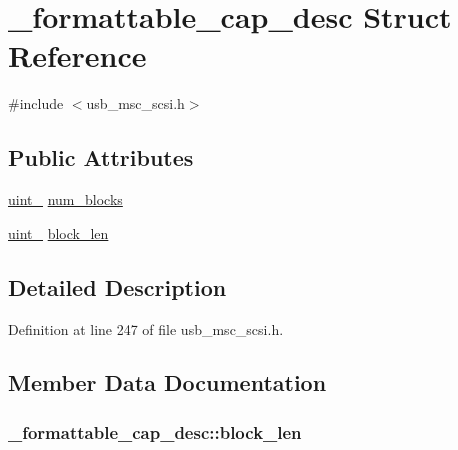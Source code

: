\hypertarget{struct__formattable__cap__desc}{}\section{\+\_\+formattable\+\_\+cap\+\_\+desc Struct Reference}
\label{struct__formattable__cap__desc}


{\ttfamily \#include $<$usb\+\_\+msc\+\_\+scsi.\+h$>$}

\subsection*{Public Attributes}
\begin{DoxyCompactItemize}
\item 
\hyperlink{types_8h_a5532400b872b4aa84e54335bf458a318}{uint\+\_} \hyperlink{struct__formattable__cap__desc_acd5b9eff05c2086f26b00499a758b0d3}{num\+\_\+blocks}
\item 
\hyperlink{types_8h_a5532400b872b4aa84e54335bf458a318}{uint\+\_} \hyperlink{struct__formattable__cap__desc_a1ad0faec6133d45921d1ab5ae3f98b90}{block\+\_\+len}
\end{DoxyCompactItemize}


\subsection{Detailed Description}


Definition at line 247 of file usb\+\_\+msc\+\_\+scsi.\+h.



\subsection{Member Data Documentation}
\subsubsection[{\texorpdfstring{block\+\_\+len}{block_len}}]{ \+\_\+formattable\+\_\+cap\+\_\+desc\+::block\+\_\+len}\hypertarget{struct__formattable__cap__desc_a1ad0faec6133d45921d1ab5ae3f98b90}{}\label{struct__formattable__cap__desc_a1ad0faec6133d45921d1ab5ae3f98b90}


